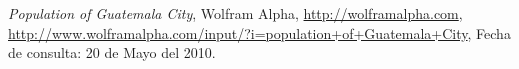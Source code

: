 \begin{thebibliography}{5}
 \textit{Population of Guatemala City}, Wolfram Alpha, \url{http://wolframalpha.com}, \url{http://www.wolframalpha.com/input/?i=population+of+Guatemala+City}, Fecha de consulta: 20 de Mayo del 2010.
\end{thebibliography}